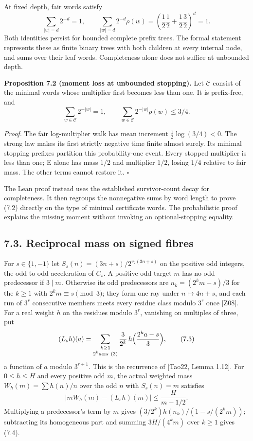 \documentclass[11pt,a4paper]{article}
\begin{document}
At fixed depth, fair words satisfy \[
\sum_{|w|=d}2^{-d}=1,\qquad
\sum_{|w|=d}2^{-d}\rho(w)
=\left(\frac12\frac12+\frac12\frac32\right)^d=1.
\tag{7.1}
\] Both identities persist for bounded complete prefix trees. The formal
statement represents these as finite binary trees with both children at
every internal node, and sums over their leaf words. Completeness alone
does not suffice at unbounded depth.

\textbf{Proposition 7.2 (moment loss at unbounded stopping).} Let
\(\mathcal C\) consist of the minimal words whose multiplier first
becomes less than one. It is prefix-free, and \[
\sum_{w\in\mathcal C}2^{-|w|}=1,\qquad
\sum_{w\in\mathcal C}2^{-|w|}\rho(w)\le3/4.
\tag{7.2}
\]

\emph{Proof.} The fair log-multiplier walk has mean increment
\(\frac12\log(3/4)<0\). The strong law makes its first strictly negative
time finite almost surely. Its minimal stopping prefixes partition this
probability-one event. Every stopped multiplier is less than one; E
alone has mass \(1/2\) and multiplier \(1/2\), losing \(1/4\) relative
to fair mass. The other terms cannot restore it. \(\square\)

The Lean proof instead uses the established survivor-count decay for
completeness. It then regroups the nonnegative sums by word length to
prove (7.2) directly on the type of minimal certificate words. The
probabilistic proof explains the missing moment without invoking an
optional-stopping equality.

\subsection{7.3. Reciprocal mass on signed
fibres}\label{reciprocal-mass-on-signed-fibres}

For \(s\in\{1,-1\}\) let \(S_s(n)=(3n+s)/2^{v_2(3n+s)}\) on the positive
odd integers, the odd-to-odd acceleration of \(C_s\). A positive odd
target \(m\) has no odd predecessor if \(3\mid m\). Otherwise its odd
predecessors are \(n_k=(2^km-s)/3\) for the \(k\ge1\) with
\(2^km\equiv s\pmod3\); they form one ray under \(n\mapsto4n+s\), and
each run of \(3^r\) consecutive members meets every residue class modulo
\(3^r\) once {[}Z08{]}. For a real weight \(h\) on the residues modulo
\(3^r\), vanishing on multiples of three, put \[
(L_sh)(a)=\sum_{\substack{k\ge1\\2^ka\equiv s\ (3)}}\frac3{2^k}\,
h\Bigl(\frac{2^ka-s}3\Bigr),
\tag{7.3}
\] a function of \(a\) modulo \(3^{r+1}\). This is the recurrence of
{[}Tao22, Lemma 1.12{]}. For \(0\le h\le H\) and every positive odd
\(m\), the actual weighted mass \(W_h(m)=\sum h(n)/n\) over the odd
\(n\) with \(S_s(n)=m\) satisfies \[
\bigl|mW_h(m)-(L_sh)(m)\bigr|\le\frac H{m-1/2}.
\tag{7.4}
\] Multiplying a predecessor's term by \(m\) gives
\((3/2^k)h(n_k)/(1-s/(2^km))\); subtracting its homogeneous part and
summing \(3H/(4^km)\) over \(k\ge1\) gives (7.4).
\end{document}
